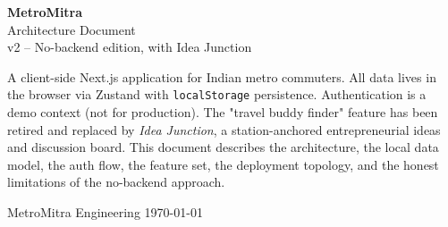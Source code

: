 \documentclass[a4paper,11pt]{article}
\begin{document}

\begin{titlepage}
\centering
\vspace*{1.5cm}


\vspace{1.2cm}
{\color{terracotta}\sffamily\Huge\bfseries MetroMitra}\\[4pt]
{\color{slate}\sffamily\Large Architecture Document}\\[2pt]
{\color{slate}\sffamily\normalsize v2 -- No-backend edition, with Idea Junction}

\vspace{2.2cm}
\begin{minipage}{0.82\textwidth}
\centering\small\color{slate}
A client-side Next.js application for Indian metro commuters.
All data lives in the browser via Zustand with \texttt{localStorage} persistence.
Authentication is a demo context (not for production). The "travel buddy finder"
feature has been retired and replaced by \emph{Idea Junction}, a station-anchored
entrepreneurial ideas and discussion board. This document describes the
architecture, the local data model, the auth flow, the feature set, the
deployment topology, and the honest limitations of the no-backend approach.
\end{minipage}

\vfill
{\color{slate}\sffamily\small MetroMitra Engineering \quad\textbullet\quad \today}
\end{titlepage}

\hypersetup{pageanchor=true}
\end{document}
